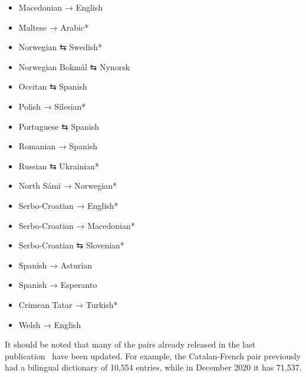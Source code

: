 \documentclass[free]{flammie}
\begin{document}
\begin{multicols}{2}
\begin{itemize}
    \item Macedonian {→} English
    \item Maltese {→} Arabic*
    \item Norwegian {⇆} Swedish*
    \item Norwegian Bokmål {⇆} Nynorsk
    \item Occitan {⇆} Spanish
    \item Polish {→} Silesian*
    \item Portuguese {⇆} Spanish
    \item Romanian {→} Spanish
    \item Russian {⇆} Ukrainian*
    \item North Sámi {→} Norwegian*
    \item Serbo-Croatian {→} English*
    \item Serbo-Croatian {→} Macedonian*
    \item Serbo-Croatian {⇆} Slovenian*
    \item Spanish {→} Asturian
    \item Spanish {→} Esperanto
    \item Crimean Tatar {→} Turkish*
    \item Welsh {→} English
\end{itemize}
\end{multicols}

It should be noted that many of the pairs already released in the last
publication~\cite{forcada2011apertium} have been updated. For example, the
Catalan-French pair previously had a bilingual dictionary of 10,554 entries,
while in December 2020 it has 71,537.


\end{document}
